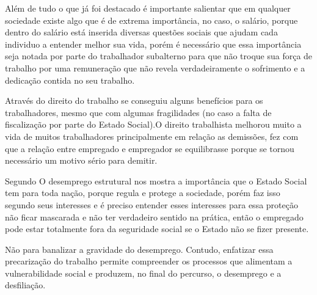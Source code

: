 Além de tudo o que já foi destacado é importante salientar que em qualquer sociedade existe algo que é de extrema 
importância, no caso, o salário, porque dentro do salário está inserida diversas questões sociais que ajudam cada 
individuo a entender melhor sua vida, porém é necessário que essa importância seja notada por parte do trabalhador 
subalterno para que não troque sua força de trabalho por uma remuneração que não revela verdadeiramente o sofrimento 
e a dedicação contida no seu trabalho.

Através do direito do trabalho se conseguiu alguns benefícios para os trabalhadores, mesmo que com algumas 
fragilidades (no caso a falta de fiscalização por parte do Estado Social).O direito trabalhista melhorou muito
a vida de muitos trabalhadores principalmente em relação as demissões, fez com que a relação entre empregado e 
empregador se equilibrasse porque se tornou necessário um motivo sério para demitir.

Segundo \cite{castel1998metamorfoses} O desemprego estrutural nos mostra a importância que o Estado Social tem para toda nação,
porque regula e protege a sociedade, porém faz isso segundo seus interesses e é preciso entender esses interesses
para essa proteção não ficar mascarada e não ter verdadeiro sentido na prática, então o empregado pode estar 
totalmente fora da seguridade social se o Estado não se fizer presente.

\begin{citacao}
Não para banalizar a gravidade do desemprego. Contudo, enfatizar essa precarização do trabalho permite 
compreender os processos que alimentam a vulnerabilidade social e produzem, no final do percurso, o desemprego 
e a desfiliação. \cite{castel1998metamorfoses}
\end{citacao}

